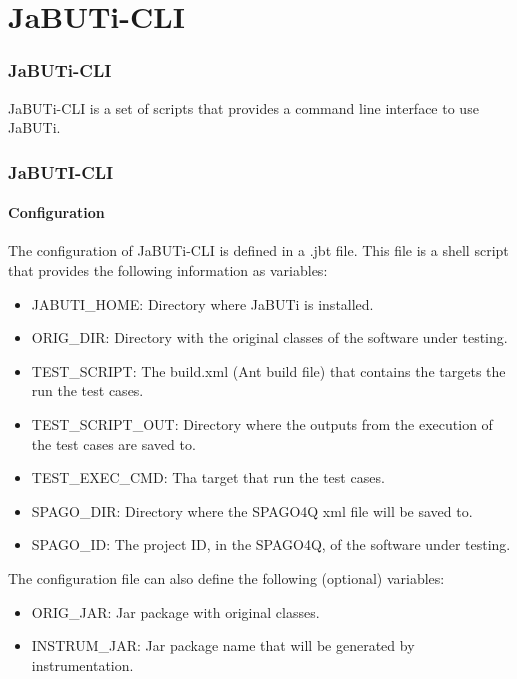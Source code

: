 \section{JaBUTi-CLI}


\begin{frame}
\frametitle{JaBUTi-CLI}

\begin{cdt-concept}
JaBUTi-CLI is a set of scripts that provides a command line interface to use
JaBUTi. 
\end{cdt-concept}

\end{frame}



\begin{frame}
\frametitle{JaBUTI-CLI}
\framesubtitle{Configuration}

\begin{cdt-facts}
The configuration of JaBUTi-CLI is defined in a .jbt file. This file is a shell
script that provides the following information as variables:
\begin{itemize}
	\item JABUTI_HOME: Directory where JaBUTi is installed.
	\item ORIG_DIR: Directory with the original classes of the software under
	testing.
	\item TEST_SCRIPT: The build.xml (Ant build file) that contains the targets
	the run the test cases.
	\item TEST_SCRIPT_OUT: Directory where the outputs from the execution of
	the test cases are saved to.
	\item TEST_EXEC_CMD: Tha target that run the test cases.
	\item SPAGO_DIR: Directory where the SPAGO4Q xml file will be saved to.
	\item SPAGO_ID: The project ID, in the SPAGO4Q, of the software under
	testing.
\end{itemize}
\end{cdt-facts}

\begin{cdt-facts}
The configuration file can also define the following (optional) variables:
\begin{itemize}
	\item ORIG_JAR: Jar package with original classes.
	\item INSTRUM_JAR: Jar package name that will be generated by
	instrumentation.
\end{itemize}
\end{cdt-facts}
\end{frame}


